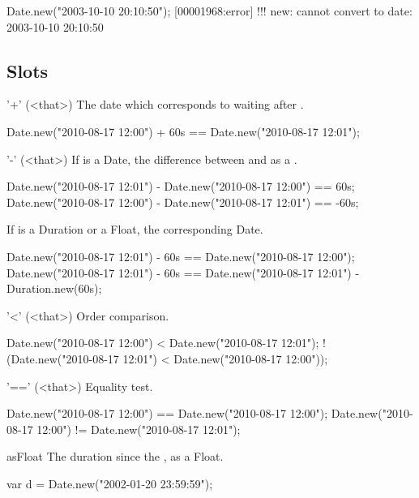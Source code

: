 \begin{urbiscript}
Date.new("2003-10-10  20:10:50");
[00001968:error] !!! new: cannot convert to date: 2003-10-10  20:10:50
\end{urbiscript}

\subsection{Slots}

\begin{urbiscriptapi}
\item['+'](<that>)%
  The date which corresponds to waiting  
  after \this.
\begin{urbiassert}
Date.new("2010-08-17 12:00") + 60s == Date.new("2010-08-17 12:01");
\end{urbiassert}


\item['-'](<that>)%
  If  is a Date, the difference between \this and  as a
  .
\begin{urbiassert}
Date.new("2010-08-17 12:01") - Date.new("2010-08-17 12:00") ==  60s;
Date.new("2010-08-17 12:00") - Date.new("2010-08-17 12:01") == -60s;
\end{urbiassert}

If  is a Duration or a Float, the corresponding Date.

\begin{urbiassert}
Date.new("2010-08-17 12:01") - 60s == Date.new("2010-08-17 12:00");
Date.new("2010-08-17 12:01") - 60s
  == Date.new("2010-08-17 12:01") - Duration.new(60s);
\end{urbiassert}


\item['<'](<that>)%
  Order comparison.
\begin{urbiassert}
   Date.new("2010-08-17 12:00") < Date.new("2010-08-17 12:01");
! (Date.new("2010-08-17 12:01") < Date.new("2010-08-17 12:00"));
\end{urbiassert}


\item['=='](<that>)%
  Equality test.
\begin{urbiassert}
Date.new("2010-08-17 12:00") == Date.new("2010-08-17 12:00");
Date.new("2010-08-17 12:00") != Date.new("2010-08-17 12:01");
\end{urbiassert}


\item[asFloat] The duration since the , as a Float.
\begin{urbiassert}
var d = Date.new("2002-01-20 23:59:59");


\end{urbiassert}
\end{urbiscriptapi}
